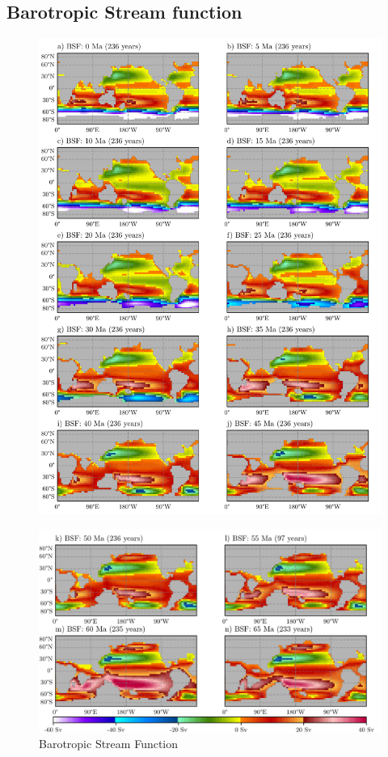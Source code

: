\documentclass[a4paper]{article}
\begin{document}
\begin{multicols}{2}
\subsection{Barotropic Stream function}
\label{sec:BSF}

\end{multicols}
\begin{figure}[H]

\includegraphics[width=1\linewidth]{BSF_1_crop.pdf}
\end{figure}
\begin{figure}[H]
\includegraphics[width=1\linewidth]{BSF_2_crop.pdf}
\caption{Barotropic Stream Function}
\label{fig:bsf_total}
\end{figure}
\end{document}
